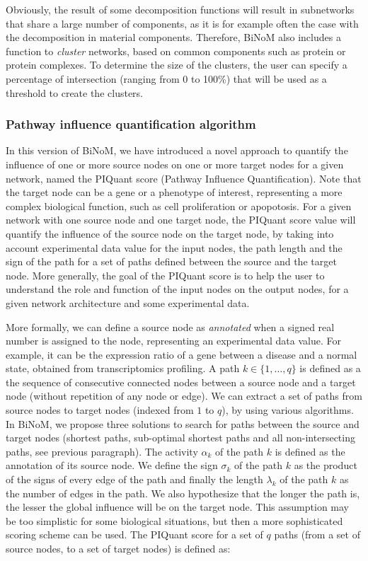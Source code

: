 \documentclass[10pt]{bmc_article}
\newenvironment{bmcformat}{\baselineskip20pt\sloppy\setboolean{publ}{false}}{\baselineskip20pt\sloppy}
\begin{document}
\begin{bmcformat}
Obviously, the result of some decomposition functions will result in subnetworks
that share a large number of components, as it is for example often the case
with the decomposition in material components. Therefore, BiNoM also includes a
function to \emph{cluster} networks, based on common components such as protein
or protein complexes. To determine the size of the clusters, the user can
specify a percentage of intersection (ranging from 0 to 100\%) that will be used
as a threshold to create the clusters.

\subsubsection*{Pathway influence quantification algorithm}
In this version of BiNoM, we have introduced a novel approach to quantify the
influence of one or more source nodes on one or more target nodes for a given
network, named the PIQuant score (Pathway Influence Quantification). Note that the target
node can be a gene or a phenotype of interest, representing a more complex
biological function, such as cell proliferation or apopotosis. For a given network with one source node and one target node,
the PIQuant score value will quantify the influence of the source node on the target
node, by taking into account experimental data value for the input nodes,
the path length and the sign of the path for a set of paths defined between the
source and the target node. More generally, the goal of the PIQuant score is to
help the user to understand the role and function of the input nodes on the
output nodes, for a given network architecture and some experimental data.

More formally, we can define a source node as \textit{annotated} when a signed real
number is assigned to the node, representing an experimental data value. For example, it
can be the expression ratio of a gene between a disease and a normal state,
obtained from transcriptomics profiling. 
 A path $k \in \{1,\ldots , q\}$ is defined
as a the sequence of consecutive connected nodes
between a source node and a target node (without repetition of any node
or edge). We can extract a set of paths from source nodes to target nodes (indexed
from $1$ to $q$), by using various algorithms. In BiNoM, we propose three solutions to search for paths between the
source and target nodes (shortest paths, sub-optimal shortest paths and all
non-intersecting paths, see previous paragraph). The activity
$\alpha_k$ of the path $k$ is defined as the annotation
of its source node. We define the sign $\sigma_k$
of the path $k$ as the product of the signs of every edge of the path and finally
the length $\lambda_k$ of the path $k$ as the number of edges in the path. We also
hypothesize that the longer the path is, the lesser the global influence will be
on the target node. This assumption may be too simplistic for some biological
situations, but then a more sophisticated scoring scheme can be used. The
PIQuant score for a set of $q$ paths (from a set of 
source nodes, to a set of target nodes) is defined as:


\end{bmcformat}
\end{document}
